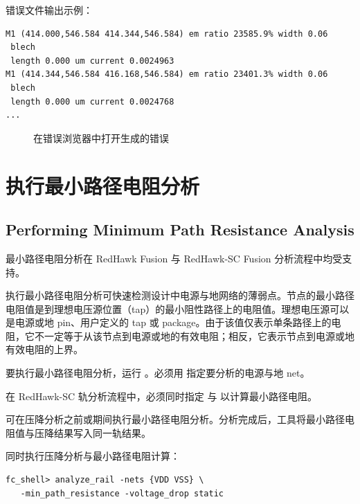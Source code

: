 错误文件输出示例：
\begin{lstlisting}
M1 (414.000,546.584 414.344,546.584) em ratio 23585.9% width 0.06
 blech
 length 0.000 um current 0.0024963
M1 (414.344,546.584 416.168,546.584) em ratio 23401.3% width 0.06
 blech
 length 0.000 um current 0.0024768
...
\end{lstlisting}

\begin{figure}[htbp]
\centering
{}
\caption{在错误浏览器中打开生成的错误}
\label{fig:em-err}
\end{figure}

\section{执行最小路径电阻分析}
\subsection*{Performing Minimum Path Resistance Analysis}

\begin{noteBox}
最小路径电阻分析在 RedHawk Fusion 与 RedHawk-SC Fusion 分析流程中均受支持。
\end{noteBox}

执行最小路径电阻分析可快速检测设计中电源与地网络的薄弱点。节点的最小路径电阻值是到理想电压源位置（tap）的最小阻性路径上的电阻值。理想电压源可以是电源或地 pin、用户定义的 tap 或 package。由于该值仅表示单条路径上的电阻，它不一定等于从该节点到电源或地的有效电阻；相反，它表示节点到电源或地有效电阻的上界。

要执行最小路径电阻分析，运行  。必须用  指定要分析的电源与地 net。

\begin{noteBox}
在 RedHawk-SC 轨分析流程中，必须同时指定  与  以计算最小路径电阻。
\end{noteBox}

可在压降分析之前或期间执行最小路径电阻分析。分析完成后，工具将最小路径电阻值与压降结果写入同一轨结果。

同时执行压降分析与最小路径电阻计算：
\begin{lstlisting}
fc_shell> analyze_rail -nets {VDD VSS} \
   -min_path_resistance -voltage_drop static
\end{lstlisting}

